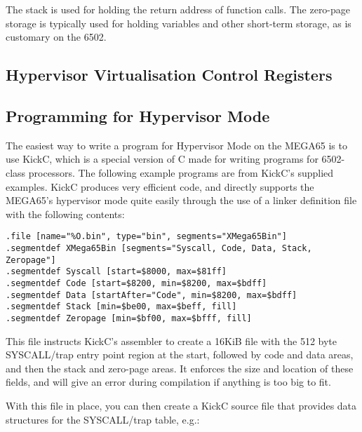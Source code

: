 The stack is used for holding the return address of function calls.  The zero-page storage is typically used for holding
variables and other short-term storage, as is customary on the 6502.

\subsection{Hypervisor Virtualisation Control Registers}



\subsection{Programming for Hypervisor Mode}

The easiest way to write a program for Hypervisor Mode on the MEGA65 is to use KickC, which is a special version of C
made for writing programs for 6502-class processors.  The following example programs are from KickC's supplied examples.
KickC produces very efficient code, and directly supports the MEGA65's
hypervisor mode quite easily through the use of a linker definition file with the following contents:

\begin{tcolorbox}[colback=black,coltext=white]
\verbatimfont{\codefont}
\begin{verbatim}
.file [name="%
.segmentdef XMega65Bin [segments="Syscall, Code, Data, Stack, Zeropage"]
.segmentdef Syscall [start=$8000, max=$81ff]
.segmentdef Code [start=$8200, min=$8200, max=$bdff]
.segmentdef Data [startAfter="Code", min=$8200, max=$bdff]
.segmentdef Stack [min=$be00, max=$beff, fill]
.segmentdef Zeropage [min=$bf00, max=$bfff, fill]
\end{verbatim}
\end{tcolorbox}

This file instructs KickC's assembler to create a 16KiB file with the 512 byte SYSCALL/trap entry point region at the start,
followed by code and data areas, and then the stack and zero-page areas. It enforces the size and location of these fields, and
will give an error during compilation if anything is too big to fit.

With this file in place, you can then create a KickC source file that provides data structures for the SYSCALL/trap table, e.g.:

